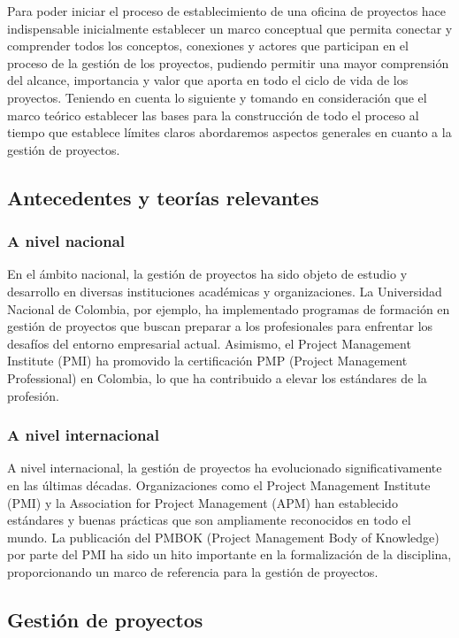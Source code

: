 \setlength{\headheight}{36.09439pt}

Para poder iniciar el proceso de establecimiento de una oficina de proyectos hace indispensable inicialmente establecer un marco conceptual que permita conectar y comprender todos los conceptos, conexiones y actores que participan en el proceso de la gestión de los proyectos, pudiendo permitir una mayor comprensión del alcance, importancia y valor que aporta en todo el ciclo de vida de los proyectos. Teniendo en cuenta lo siguiente y tomando en consideración que el marco teórico establecer las bases para la construcción de todo el proceso al tiempo que establece límites claros abordaremos aspectos generales en cuanto a la gestión de proyectos.

\subsection{Antecedentes y teorías relevantes}
\subsubsection{A nivel nacional}
En el ámbito nacional, la gestión de proyectos ha sido objeto de estudio y desarrollo en diversas instituciones académicas y organizaciones. La Universidad Nacional de Colombia, por ejemplo, ha implementado programas de formación en gestión de proyectos que buscan preparar a los profesionales para enfrentar los desafíos del entorno empresarial actual. Asimismo, el Project Management Institute (PMI) ha promovido la certificación PMP (Project Management Professional) en Colombia, lo que ha contribuido a elevar los estándares de la profesión.

\subsubsection{A nivel internacional}
A nivel internacional, la gestión de proyectos ha evolucionado significativamente en las últimas décadas. Organizaciones como el Project Management Institute (PMI) y la Association for Project Management (APM) han establecido estándares y buenas prácticas que son ampliamente reconocidos en todo el mundo. La publicación del PMBOK (Project Management Body of Knowledge) por parte del PMI ha sido un hito importante en la formalización de la disciplina, proporcionando un marco de referencia para la gestión de proyectos.

\subsection{Gestión de proyectos}
